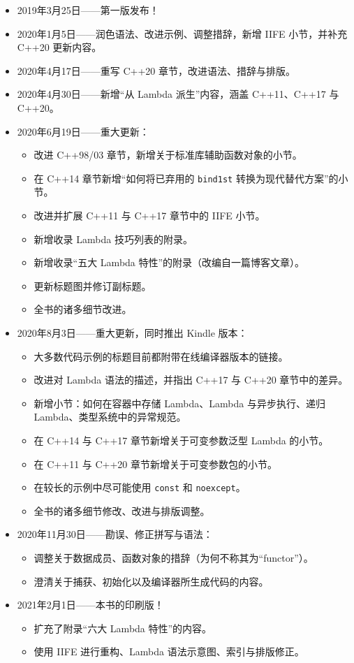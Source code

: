 \begin{itemize}
\item 2019年3月25日——第一版发布！
\item 2020年1月5日——润色语法、改进示例、调整措辞，新增 IIFE 小节，并补充 C++20 更新内容。
\item 2020年4月17日——重写 C++20 章节，改进语法、措辞与排版。
\item 2020年4月30日——新增“从 Lambda 派生”内容，涵盖 C++11、C++17 与 C++20。
\item 2020年6月19日——重大更新：
  \begin{itemize}
  \item 改进 C++98/03 章节，新增关于标准库辅助函数对象的小节。
  \item 在 C++14 章节新增“如何将已弃用的 \texttt{bind1st} 转换为现代替代方案”的小节。
  \item 改进并扩展 C++11 与 C++17 章节中的 IIFE 小节。
  \item 新增收录 Lambda 技巧列表的附录。
  \item 新增收录“五大 Lambda 特性”的附录（改编自一篇博客文章）。
  \item 更新标题图并修订副标题。
  \item 全书的诸多细节改进。
  \end{itemize}
\item 2020年8月3日——重大更新，同时推出 Kindle 版本：
  \begin{itemize}
  \item 大多数代码示例的标题目前都附带在线编译器版本的链接。
  \item 改进对 Lambda 语法的描述，并指出 C++17 与 C++20 章节中的差异。
  \item 新增小节：如何在容器中存储 Lambda、Lambda 与异步执行、递归 Lambda、类型系统中的异常规范。
  \item 在 C++14 与 C++17 章节新增关于可变参数泛型 Lambda 的小节。
  \item 在 C++11 与 C++20 章节新增关于可变参数包的小节。
  \item 在较长的示例中尽可能使用 \texttt{const} 和 \texttt{noexcept}。
  \item 全书的诸多细节修改、改进与排版调整。
  \end{itemize}
\item 2020年11月30日——勘误、修正拼写与语法：
  \begin{itemize}
  \item 调整关于数据成员、函数对象的措辞（为何不称其为“functor”）。
  \item 澄清关于捕获、初始化以及编译器所生成代码的内容。
  \end{itemize}
\item 2021年2月1日——本书的印刷版！
  \begin{itemize}
  \item 扩充了附录“六大 Lambda 特性”的内容。
  \item 使用 IIFE 进行重构、Lambda 语法示意图、索引与排版修正。
  \end{itemize}
\end{itemize}
